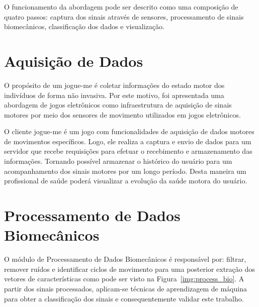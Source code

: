 
O funcionamento da abordagem pode ser descrito como uma composição de quatro passos: captura dos sinais através de sensores, processamento de sinais biomecânicos, classificação dos dados e visualização.

\section{Aquisição de Dados}
O propósito de um \ac{jogue-me} é coletar informações do estado motor dos indivíduos de forma não invasiva. Por este motivo, foi apresentada uma abordagem de jogos eletrônicos como infraestrutura de aquisição de sinais motores por meio dos sensores de movimento utilizados em jogos eletrônicos.

O cliente \ac{jogue-me} é um jogo com funcionalidades de aquisição de dados motores de movimentos específicos. Logo, ele realiza a captura e envio de dados para um servidor que recebe requisições para efetuar o recebimento e armazenamento das informações. Tornando possível armazenar o histórico do usuário para um acompanhamento dos sinais motores por um longo período. Desta maneira um profissional de saúde poderá visualizar a evolução da saúde motora do usuário.

\section{Processamento de Dados Biomecânicos}\label{sec:processador_bio}
O módulo de Processamento de Dados Biomecânicos é responsável por: filtrar, remover ruídos e identificar ciclos de movimento para uma posterior extração dos vetores de características como pode ser visto na Figura~\ref{img:process_bio}. A partir dos sinais processados, aplicam-se técnicas de aprendizagem de máquina para obter a classificação dos sinais e consequentemente validar este trabalho.

